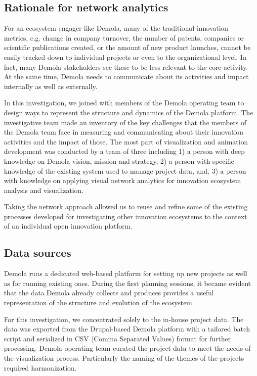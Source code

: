 \subsection{Rationale for network analytics}

For an ecosystem engager like Demola, many of the traditional innovation metrics, e.g. change in company turnover, the number of patents, companies or scientific publications created, or the amount of new product launches, cannot be easily tracked down to individual projects or even to the organizational level. In fact, many Demola stakeholders see these to be less relevant to the core activity. At the same time, Demola needs to communicate about its activities and impact internally as well as externally.

In this investigation, we joined with members of the Demola operating team to design ways to represent the structure and dynamics of the Demola platform. The investigative team made an inventory of the key challenges that the members of the Demola team face in measuring and communicating about their innovation activities and the impact of those. The most part of visualization and animation development was conducted by a team of three including 1) a person with deep knowledge on Demola vision, mission and strategy, 2) a person with specific knowledge of the existing system used to manage project data, and, 3) a person with knowledge on applying visual network analytics for innovation ecosystem analysis and visualization.

Taking the network approach allowed us to reuse and refine some of the existing processes developed for investigating other innovation ecosystems to the context of an individual open innovation platform.

\subsection{Data sources}

Demola runs a dedicated web-based platform for setting up new projects as well as for running existing ones. During the first planning sessions, it became evident that the data Demola already collects and produces provides a useful representation of the structure and evolution of the ecosystem.

For this investigation, we concentrated solely to the in-house project data. The data was exported from the Drupal-based Demola platform with a tailored batch script and serialized in CSV (Comma Separated Values) format for further processing. Demola operating team curated the project data to meet the needs of the visualization process. Particularly the naming of the themes of the projects required harmonization.

